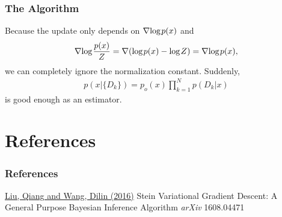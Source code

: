 \documentclass[aspectratio=169]{beamer}
\begin{document}


\begin{frame}
    \frametitle{The Algorithm}
    Because the update only depends on $\nabla \textup{log} \hskip0.1em p(x)$ and \begin{align*}
        \nabla \textup{log} \hskip0.1em \frac{p(x)}{Z} = \nabla (\textup{log} \hskip0.1em p(x) - \textup{log} \hskip0.1em Z) = \nabla \textup{log} \hskip0.1em p(x),
    \end{align*}
    we can completely ignore the normalization constant. Suddenly,
    \begin{align*}
        p(x \vert \{ D_k\}) = p_o(x) \prod\limits_{k=1}^{N} p(D_k \vert x)
    \end{align*}
    is good enough as an estimator.
\end{frame}
\section{References}

\begin{frame}
\frametitle{References}
\footnotesize{
\begin{thebibliography}{99}
\bibitem {}\href{https://arxiv.org/abs/1608.04471}{Liu, Qiang and Wang, Dilin (2016)}
\newblock Stein Variational Gradient Descent: A General Purpose Bayesian Inference Algorithm
\newblock \emph{arXiv} 1608.04471
\end{thebibliography}
}
\end{frame}
\end{document}
